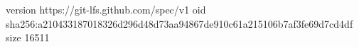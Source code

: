 version https://git-lfs.github.com/spec/v1
oid sha256:a210433187018326d296d48d73aa94867de910c61a215106b7af3fe69d7cd4df
size 16511
